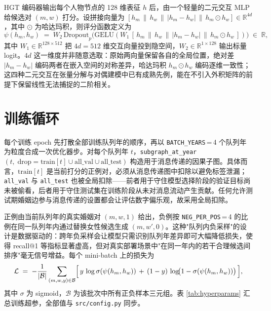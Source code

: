 HGT 编码器输出每个人物节点的 128 维表征 \(h\) 后，由一个轻量的二元交互 MLP 给候选对 \((m,w)\) 打分。设拼接向量为 \([h_m\,\|\,h_w\,\|\,|h_m-h_w|\,\|\,h_m\odot h_w]\in\mathbb{R}^{4d}\)，其中 \(\odot\) 为哈达玛积，则评分函数定义为
\begin{equation}\label{eq:scorer}
  \psi(h_m,h_w) \;=\; W_2\,\mathrm{Dropout}_p\!\bigl(\mathrm{GELU}(W_1\,[\,h_m\,\|\,h_w\,\|\,|h_m-h_w|\,\|\,h_m\odot h_w\,])\bigr)\;\in\;\mathbb{R},
\end{equation}
其中 \(W_1\in\mathbb{R}^{128\times 512}\) 把 \(4d=512\) 维交互向量投到隐空间，\(W_2\in\mathbb{R}^{1\times 128}\) 输出标量 logit。\(4d\) 这一维度并非随意选取：原始两向量保留各自的全局位置，绝对差 \(|h_m-h_w|\) 编码两者在嵌入空间的对称差异，哈达玛积 \(h_m\odot h_w\) 编码逐维一致性；这四种二元交互在张量分解与对偶建模中已有成熟先例\citep{vaswani2017attention}，能在不引入外积矩阵的前提下保留线性无法捕捉的二阶相关。

\section{训练循环}\label{sec:hgt-train}

每个训练 epoch 先打散全部训练队列年的顺序，再以 \texttt{BATCH\_YEARS}\,=\,4 个队列年为粒度合成一次优化器步。对每个队列年 \(t\)，\texttt{subgraph\_at\_year}\((t,\;\text{drop}=\text{train}[t]\cup\text{all\_val}\cup\text{all\_test})\) 构造用于消息传递的因果子图。具体而言，\(\text{train}[t]\) 是当前打分的正例对，必须从消息传递图中扣除以避免标签泄漏；\texttt{all\_val} 与 \texttt{all\_test} 也被全局扣除——前者用于守住模型选择阶段的验证目标尚未被偷看，后者用于守住测试集在训练阶段从未对消息流动产生贡献。任何允许测试期婚姻边参与消息传递的设置都会让评估数字偏乐观，故采用全局扣除。

正例由当前队列年的真实婚姻对 \((m,w,1)\) 给出，负例按 \texttt{NEG\_PER\_POS}\,=\,4 的比例在同一队列年内通过替换女性候选生成 \((m,w',0)\)。这种"队列内负采样"的设计是数据驱动的：跨年负采样会让模型只需识别队列年差异即可大幅降低损失，使得 recall@1 等指标显著虚高，但对真实部署场景中"在同一年内的若干合理候选间排序"毫无信号增益。每个 mini-batch 上的损失为
\begin{equation}\label{eq:loss}
  \mathcal{L} \;=\; -\frac{1}{|\mathcal{B}|}\sum_{(m,w,y)\in\mathcal{B}}\Bigl[\,y\,\log\sigma(\psi(h_m,h_w))\,+\,(1-y)\,\log\!\bigl(1-\sigma(\psi(h_m,h_w))\bigr)\,\Bigr],
\end{equation}
其中 \(\sigma\) 为 sigmoid，\(\mathcal{B}\) 为该批次中所有正负样本三元组。表 \ref{tab:hyperparams} 汇总训练超参，全部值与 \texttt{src/config.py} 同步。


